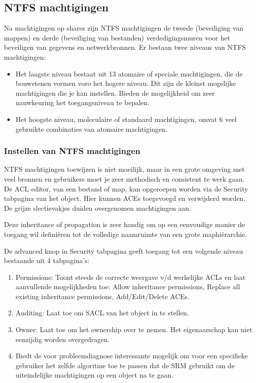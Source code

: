 \subsection{NTFS machtigingen}

Na machtigingen op shares zijn NTFS machtigingen de tweede (beveiliging van
mappen) en derde (beveiliging van bestanden) verdedigingsmuren voor het
beveiligen van gegevens en netwerkbronnen. Er bestaan twee niveaus van NTFS
machtigingen:
\begin{itemize}
	\item Het laagste niveau bestaat uit 13 atomaire of speciale
		machtigingen, die de bouwstenen vormen voro het hogere niveau.
		Dit zijn de kleinst mogelijke machtigingen die je kan instellen.
		Bieden de mogelijkheid om zeer nauwkeuring het toegangsniveau te
		bepalen.
	\item Het hoogste niveau, moleculaire of standaard machtigingen, omvat 6
		veel gebruikte combinaties van atomaire machtigingen.
\end{itemize}

\subsubsection{Instellen van NTFS machtigingen}

NTFS machtigingen toewijzen is niet moeilijk, maar in een grote omgeving met
veel bronnen en gebruikers moet je zeer methodisch en consistent te werk gaan.
De ACL editor, van een bestand of map, kan opgeroepen worden via de Security
tabpagina van het object. Hier kunnen ACEs toegevoegd en verwijderd worden. De
grijze slectievakjes duiden overgenomen machtigingen aan.

Deze inheritance of propagation is zeer handig om op een eenvoudige manier de
toegang wil definiëren tot de volledige naamruimte van een grote maphiërarchie.

De advanced knop in Security tabpagina geeft toegang tot een volgende niveau
bestaande uit 4 tabpagina's:
\begin{enumerate}
	\item Permissions: Toont steeds de correcte weergave v/d werkelijke
		ACLs en laat aanvullende mogelijkheden toe: Allow inheritance
		permissions, Replace all existing inheritance permissions,
		Add/Edit/Delete ACEs.
	\item Auditing: Laat toe om SACL van het object in te stellen.
	\item Owner: Laat toe om het ownership over te nemen. Het eigenaarschap
		kan niet eenzijdig worden overgedragen.
	\item Biedt de voor probleemdiagnose interessante mogelijk om voor een
		specifieke gebruiker het zelfde algoritme toe te passen dat de
		SRM gebruikt om de uiteindelijke machtigingen op een object na
		te gaan.
\end{enumerate}

